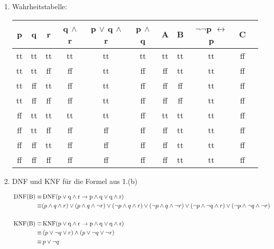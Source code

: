 \begin{enumerate}
	\item Wahrheitstabelle:

	\begin{center}
	\begin{tabular}{|c|c|c||c|c|c|c|c|c|c|c|}
p & q & r & q $\land$ r & p $\lor$ q $\land$ r & p $\land$ q & A & B & $\lnot\lnot$p $\leftrightarrow$ p & C\\
\hline
tt	&	tt	&	tt	&	tt	&	tt	&	tt	&	tt		&	tt	&	tt	&	f\/f	\\
tt	&	tt	&	f\/f &	f\/f	&	tt	&	f\/f	&	f\/f		&	tt	&	tt	&	f\/f	\\
tt	&	f\/f	&	tt	&	f\/f	&	tt	&	f\/f	&	f\/f		&	f\/f	&	tt	&	f\/f	\\
tt & f\/f	&	f\/f	&	f\/f	&	tt	&	f\/f	&	f\/f		&	f\/f	&	tt	&	f\/f	\\
f\/f	& tt	&	tt	&	tt	&	tt	&	f\/f	&	tt	&	tt	&	tt	& 	f\/f	\\
f\/f	& tt	&	f\/f	&	f\/f	&	f\/f	&	f\/f	&	f\/f	&	tt	&	tt	&	f\/f	\\
f\/f	& f\/f	&	tt	&	f\/f	&	f\/f	&	f\/f	&	f\/f		&	tt	&	tt	&	f\/f	\\
f\/f	& f\/f	&	f\/f	&	f\/f	&	f\/f	&	f\/f	&	f\/f	&	tt	&	tt	&	f\/f	\\
\end{tabular}
\end{center}

	\item DNF und KNF für die Formel aus 1.(b)

\begin{align*}
\mathrm{\,DNF({B})} \equiv & \mathrm{\,DNF({p \lor q \land r \rightarrow p \land q \lor q \land r})} \\
\equiv & (p \land q \land r) \lor (p \land q \land \lnot r) \lor (\lnot p \land q\land r) \lor (\lnot p \land q \land \lnot r) \lor (\lnot p \land \lnot q \land r) \lor (\lnot p \land \lnot q \land \lnot r)
\\
\\
\mathrm{\,KNF({B})} \equiv & \mathrm{\,KNF({p \lor q \land r \rightarrow p \land q \lor q \land r})} \\
\equiv & \, (p \lor \lnot q \lor r) \land (p \lor \lnot q \lor \lnot r) \\
\equiv & \, p \lor \lnot q
\end{align*}
\end{enumerate}



